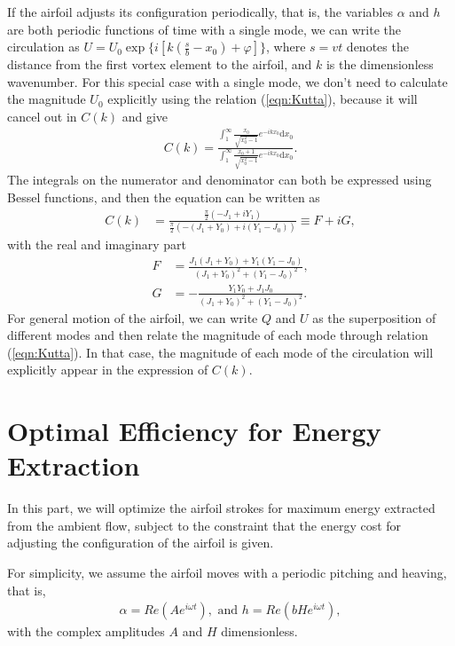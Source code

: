 If the airfoil adjusts its configuration periodically, that is, the variables $\alpha$ and $h$ are both periodic functions of time with a single mode, we can write the circulation as $U = U_0 \exp \{i[k(\frac{s}{b}-x_0)+ \varphi] \}$, where $s = vt$ denotes the distance from the first vortex element to the airfoil, and $k$ is the dimensionless wavenumber.
For this special case with a single mode, we don't need to calculate the magnitude $U_0$ explicitly using the relation (\ref{eqn:Kutta}), because it will cancel out in $C(k)$ and give
\begin{align}
C(k) = \frac{\int_{1}^{\infty} \frac{x_0}{\sqrt{x_0^2-1}} e^{-ikx_0} \mathrm{d}x_0}{\int_{1}^{\infty} \frac{x_0+1}{\sqrt{x_0^2-1}} e^{-ikx_0} \mathrm{d}x_0}.
\end{align}
The integrals on the numerator and denominator can both be expressed using Bessel functions, and then the equation can be written as
\begin{align}
C(k) & =  \frac{\frac{\pi}{2}(-J_1+iY_1)}{\frac{\pi}{2}(-(J_1+Y_0)+i(Y_1-J_0))}
          \equiv  F+iG,
\end{align}
with the real and imaginary part
\begin{align}
F & = \frac{J_1(J_1+Y_0)+Y_1(Y_1-J_0)}{(J_1+Y_0)^2+(Y_1-J_0)^2},  \\
G & = -\frac{Y_1Y_0+J_1J_0}{(J_1+Y_0)^2+(Y_1-J_0)^2}.
\end{align}
For general motion of the airfoil, we can write $Q$  and $U$ as the superposition of different modes and then relate the magnitude of each mode through relation (\ref{eqn:Kutta}). In that case, the magnitude of each mode of the circulation will explicitly appear in the expression of $C(k)$.


\section{Optimal Efficiency for Energy Extraction}

In this part, we will optimize the airfoil strokes for maximum energy extracted from the ambient flow, subject to the constraint that the energy cost for adjusting the configuration of the airfoil is given.

For simplicity, we assume the airfoil moves with a periodic pitching and heaving, that is,
\begin{align}
\alpha = Re(A e^{i\omega t}),    \text{    and   }        h = Re(bH e^{i\omega t}),
\end{align}
with the complex amplitudes $A$ and $H$ dimensionless.

